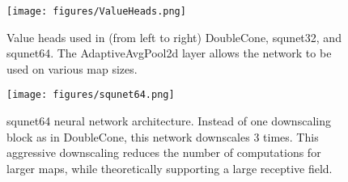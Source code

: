 \documentclass[conference]{IEEEtran}
\newcounter{suppfigure}
\newenvironment{suppfigure}
  {\renewcommand{\figurename}{Supplemental Fig.}\setcounter{figure}{\value{suppfigure}}\addtocounter{suppfigure}{1}\begin{figure}}
  {\end{figure}\setcounter{suppfigure}{\value{figure}}}
\begin{document}
\begin{suppfigure}[H]
    \begin{center}
        \texttt{[image: figures/ValueHeads.png]}
    \end{center}
    \caption{Value heads used in (from left to right) DoubleCone, squnet32, and
    squnet64. The AdaptiveAvgPool2d layer allows the network to be used on various map
    sizes.}
    \label{fig:valueheads}
\end{suppfigure}

\begin{suppfigure}[H]
    \begin{center}
        \texttt{[image: figures/squnet64.png]}
    \end{center}
    \caption{squnet64 neural network architecture. Instead of one downscaling block as in DoubleCone, this network downscales 3 times. This aggressive downscaling reduces the number of computations for larger maps, while theoretically supporting a large receptive field.}
    \label{fig:squnet}
\end{suppfigure}
        
\end{document}
